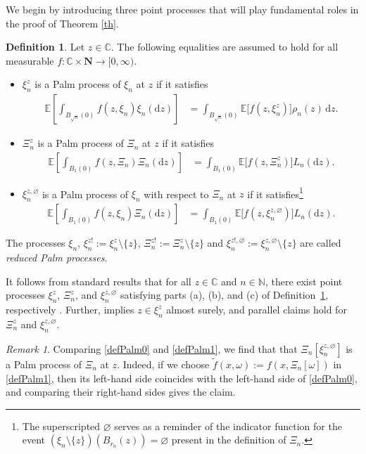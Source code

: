 \documentclass{amsart}
\theoremstyle{plain}
\theoremstyle{definition}
\newtheorem{definition}[theorem]{Definition}
\theoremstyle{remark}
\newtheorem{remark}[theorem]{Remark}
\def\E{\mathbb E}
\def\d{\mathrm d}
\begin{document}
We begin by introducing three point processes that will play fundamental roles in the proof of Theorem \ref{th}.
\begin{definition} \label{d:palm}
	Let $z \in \mathbb C$. The following equalities are assumed to hold for all measurable $f\colon \mathbb{C} \times \mathbf{N} \to [0,\infty)$.
	\begin{itemize}
		\item[(a)]  $\xi_n^z$ is a Palm process of $\xi_n$ at $z$ if it satisfies
		\begin{align}
			\E \left[\int_{ B_{\sqrt n}(0)} f(z,\xi_n)\xi_n(\d z )\right]&=\int_{ B_{\sqrt n}(0)} \E \big[f(z,\xi_n^{z}) \big]\rho_n(z) \, \d z. \label{defPalm}
		\end{align}
	\item[(b)]  $\Xi_n^z$ is a Palm process of $\Xi_n$ at $z$ if it satisfies
	\begin{align}
		\E \left[\int_{ B_{1}(0)} f(z,\Xi_n)\Xi_n(\d z )\right]&=\int_{ B_{1}(0)} \E\big [f(z,\Xi_n^{z}) \big]L_n(\d z). \label{defPalm0}
	\end{align}
	\item[(c)]  $\xi_n^{z,\varnothing}$ is a Palm process of $\xi_n$ with respect to $\Xi_n$ at $z$ if it satisfies\footnote{The superscripted $\varnothing$ serves as a reminder of the indicator function for  the event $(\xi_n \setminus \{z\}) (B_{r_n}(z)) = \varnothing$ present in the definition of $\Xi_n$.}
\begin{align}
\E \left[\int_{B_{1}(0)} f(z,\xi_n)\Xi_n(\d z )\right]&=\int_{ B_{1}(0)} \E \big[f(z,\xi_n^{z,\varnothing}) \big]L_n(\d z). \label{defPalm1}
\end{align}
\end{itemize}
The processes $\xi_n$, $\xi_n^{z!}:=\xi_n^z\setminus \{z\}$, $\Xi_n^{z!}:=\Xi_n^z \setminus \{z\}$ and $\xi_n^{z!,\varnothing}:=\xi_n^{z,\varnothing}\setminus \{z\}$ are called {\em reduced Palm processes}.
\end{definition}

It follows from standard results that for all $z  \in \mathbb C$ and  $n \in \mathbb{N}$, there exist  point processes $\xi_n^{z}$, $\Xi_n^{z}$, and $\xi_n^{z, \varnothing}$ satisfying parts (a), (b), and (c) of Definition~\ref{d:palm}, respectively \cite[Chapter 6]{K17}. Further, \cite[Lemma 6.2(ii)]{K17} implies $z \in \xi_n^{z}$ almost surely, and parallel claims hold for $\Xi_n^{z}$ and $\xi_n^{z, \varnothing}$.
\begin{remark}\label{r:XiPalm}
Comparing 
\eqref{defPalm0} and \eqref{defPalm1}, we find that that $\Xi_n[\xi_n^{z,\varnothing}]$ is a Palm process of $\Xi_n$ at $z$. Indeed, if we choose $\tilde f(x,\omega):=f(x,\Xi_n[\omega])$ in \eqref{defPalm1}, then its left-hand side coincides with the left-hand side of \eqref{defPalm0}, and comparing their right-hand sides gives the claim.
\end{remark}
\end{document}

